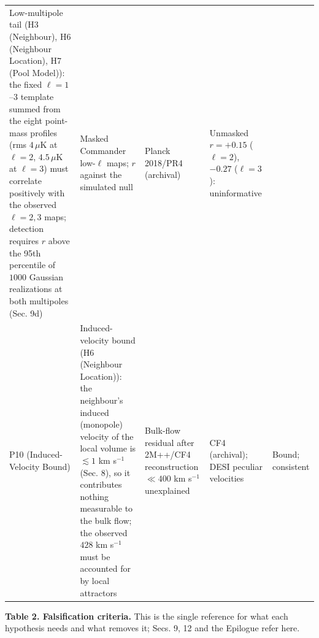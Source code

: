 \documentclass[
]{article}
\begin{document}
\begin{longtable}[]{@{}lllll@{}}
\begin{minipage}[t]{0.19\columnwidth}
Low-multipole tail (H3 (Neighbour), H6 (Neighbour Location), H7 (Pool
Model)): the fixed \(\ell = 1\)--\(3\) template summed from the eight
point-mass profiles (rms \(4\,\mu\)K at \(\ell = 2\), \(4.5\,\mu\)K at
\(\ell = 3\)) must correlate positively with the observed
\(\ell = 2, 3\) maps; detection requires \(r\) above the 95th percentile
of \(1000\) Gaussian realizations at both multipoles (Sec. 9d)\strut
\end{minipage} & \begin{minipage}[t]{0.19\columnwidth}\raggedright
Masked Commander low-\(\ell\) maps; \(r\) against the simulated
null\strut
\end{minipage} & \begin{minipage}[t]{0.19\columnwidth}\raggedright
Planck 2018/PR4 (archival)\strut
\end{minipage} & \begin{minipage}[t]{0.19\columnwidth}\raggedright
Unmasked \(r = +0.15\) (\(\ell=2\)), \(-0.27\) (\(\ell=3\)):
uninformative\strut
\end{minipage}\tabularnewline
\begin{minipage}[t]{0.11\columnwidth}\raggedright
P10 (Induced-Velocity Bound)\strut
\end{minipage} & \begin{minipage}[t]{0.19\columnwidth}\raggedright
Induced-velocity bound (H6 (Neighbour Location)): the neighbour's
induced (monopole) velocity of the local volume is \(\lesssim 1\) km
s\(^{-1}\) (Sec. 8), so it contributes nothing measurable to the bulk
flow; the observed \(428\) km s\(^{-1}\) must be accounted for by local
attractors\strut
\end{minipage} & \begin{minipage}[t]{0.19\columnwidth}\raggedright
Bulk-flow residual after 2M++/CF4 reconstruction \(\ll 400\) km
s\(^{-1}\) unexplained\strut
\end{minipage} & \begin{minipage}[t]{0.19\columnwidth}\raggedright
CF4 (archival); DESI peculiar velocities\strut
\end{minipage} & \begin{minipage}[t]{0.19\columnwidth}\raggedright
Bound; consistent\strut
\end{minipage}\tabularnewline
\bottomrule
\end{longtable}

\textbf{Table 2. Falsification criteria.} This is the single reference
for what each hypothesis needs and what removes it; Secs. 9, 12 and the
Epilogue refer here.
\end{document}
